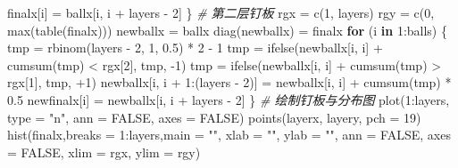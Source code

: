 \documentclass[]{tufte-book}
\newenvironment{Shaded}{}{}
\newcommand{\AttributeTok}[1]{\textcolor[rgb]{0.49,0.56,0.16}{#1}}
\newcommand{\CommentTok}[1]{\textcolor[rgb]{0.38,0.63,0.69}{\textit{#1}}}
\newcommand{\ConstantTok}[1]{\textcolor[rgb]{0.53,0.00,0.00}{#1}}
\newcommand{\ControlFlowTok}[1]{\textcolor[rgb]{0.00,0.44,0.13}{\textbf{#1}}}
\newcommand{\DecValTok}[1]{\textcolor[rgb]{0.25,0.63,0.44}{#1}}
\newcommand{\FloatTok}[1]{\textcolor[rgb]{0.25,0.63,0.44}{#1}}
\newcommand{\FunctionTok}[1]{\textcolor[rgb]{0.02,0.16,0.49}{#1}}
\newcommand{\NormalTok}[1]{#1}
\newcommand{\OtherTok}[1]{\textcolor[rgb]{0.00,0.44,0.13}{#1}}
\newcommand{\SpecialCharTok}[1]{\textcolor[rgb]{0.25,0.44,0.63}{#1}}
\newcommand{\StringTok}[1]{\textcolor[rgb]{0.25,0.44,0.63}{#1}}
\begin{document}
\begin{Shaded}
\begin{Highlighting}[]
\NormalTok{        finalx[i] }\OtherTok{=}\NormalTok{ ballx[i, i }\SpecialCharTok{+}\NormalTok{ layers }\SpecialCharTok{{-}} \DecValTok{2}\NormalTok{]}
\NormalTok{\}}
\CommentTok{\# 第二层钉板}
\NormalTok{rgx }\OtherTok{=} \FunctionTok{c}\NormalTok{(}\DecValTok{1}\NormalTok{, layers)}
\NormalTok{rgy }\OtherTok{=} \FunctionTok{c}\NormalTok{(}\DecValTok{0}\NormalTok{, }\FunctionTok{max}\NormalTok{(}\FunctionTok{table}\NormalTok{(finalx)))}
\NormalTok{newballx }\OtherTok{=}\NormalTok{ ballx}
\FunctionTok{diag}\NormalTok{(newballx) }\OtherTok{=}\NormalTok{ finalx}
\ControlFlowTok{for}\NormalTok{ (i }\ControlFlowTok{in} \DecValTok{1}\SpecialCharTok{:}\NormalTok{balls) \{}
\NormalTok{        tmp }\OtherTok{=} \FunctionTok{rbinom}\NormalTok{(layers }\SpecialCharTok{{-}} \DecValTok{2}\NormalTok{, }\DecValTok{1}\NormalTok{, }\FloatTok{0.5}\NormalTok{) }\SpecialCharTok{*} \DecValTok{2} \SpecialCharTok{{-}} \DecValTok{1}
\NormalTok{        tmp }\OtherTok{=} \FunctionTok{ifelse}\NormalTok{(newballx[i, i] }\SpecialCharTok{+} \FunctionTok{cumsum}\NormalTok{(tmp) }\SpecialCharTok{\textless{}}\NormalTok{ rgx[}\DecValTok{2}\NormalTok{], tmp, }
                     \SpecialCharTok{{-}}\DecValTok{1}\NormalTok{)}
\NormalTok{        tmp }\OtherTok{=} \FunctionTok{ifelse}\NormalTok{(newballx[i, i] }\SpecialCharTok{+} \FunctionTok{cumsum}\NormalTok{(tmp) }\SpecialCharTok{\textgreater{}}\NormalTok{ rgx[}\DecValTok{1}\NormalTok{], tmp, }
                     \SpecialCharTok{+}\DecValTok{1}\NormalTok{)}
\NormalTok{        newballx[i, i }\SpecialCharTok{+} \DecValTok{1}\SpecialCharTok{:}\NormalTok{(layers }\SpecialCharTok{{-}} \DecValTok{2}\NormalTok{)] }\OtherTok{=}\NormalTok{ newballx[i, i] }\SpecialCharTok{+} \FunctionTok{cumsum}\NormalTok{(tmp) }\SpecialCharTok{*} 
                \FloatTok{0.5}
\NormalTok{        newfinalx[i] }\OtherTok{=}\NormalTok{ newballx[i, i }\SpecialCharTok{+}\NormalTok{ layers }\SpecialCharTok{{-}} \DecValTok{2}\NormalTok{]}
\NormalTok{\}}
\CommentTok{\# 绘制钉板与分布图}
\FunctionTok{plot}\NormalTok{(}\DecValTok{1}\SpecialCharTok{:}\NormalTok{layers, }\AttributeTok{type =} \StringTok{"n"}\NormalTok{, }\AttributeTok{ann =} \ConstantTok{FALSE}\NormalTok{, }\AttributeTok{axes =} \ConstantTok{FALSE}\NormalTok{)}
\FunctionTok{points}\NormalTok{(layerx, layery, }\AttributeTok{pch =} \DecValTok{19}\NormalTok{)}
\FunctionTok{hist}\NormalTok{(finalx,}\AttributeTok{breaks =} \DecValTok{1}\SpecialCharTok{:}\NormalTok{layers,}\AttributeTok{main =} \StringTok{""}\NormalTok{, }\AttributeTok{xlab =} \StringTok{""}\NormalTok{, }\AttributeTok{ylab =} \StringTok{""}\NormalTok{, }\AttributeTok{ann =} \ConstantTok{FALSE}\NormalTok{, }\AttributeTok{axes =} \ConstantTok{FALSE}\NormalTok{, }\AttributeTok{xlim =}\NormalTok{ rgx, }\AttributeTok{ylim =}\NormalTok{ rgy)}

\end{Highlighting}
\end{Shaded}
\end{document}
